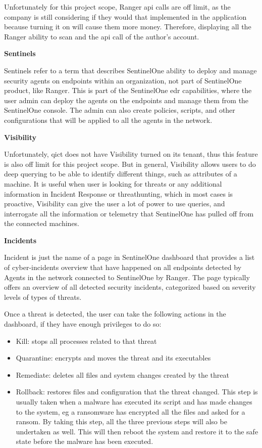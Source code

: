 Unfortunately for this project scope, Ranger \acrshort{api} calls are off limit, as the company is still considering if they would
that implemented in the application because turning it on will cause them more money. Therefore, displaying all the Ranger ability
to scan and the \acrshort{api} call of the author's account.

\textbf{Sentinels}

Sentinels refer to a term that describes SentinelOne ability to deploy and manage security agents on endpoints within an
organization, not part of SentinelOne product, like Ranger. This is part of the SentinelOne \acrshort{edr} capabilities,
where the user admin can deploy the agents on the endpoints and manage them from the SentinelOne console. The admin can
also create policies, scripts, and other configurations that will be applied to all the agents in the network.

\textbf{Visibility}

Unfortunately, \acrshort{qict} does not have Visibility turned on its tenant, thus this feature is also off limit for this project
scope. But in general, Visibility allows users to do deep querying to be able to identify different things, such as attributes of
a machine. It is useful when user is looking for threats or any additional information in Incident Response or \gls{threathunting},
which in most cases is proactive, Visibility can give the user a lot of power to use queries, and interrogate all the information
or telemetry that SentinelOne has pulled off from the connected machines.

\textbf{Incidents}

Incident is just the name of a page in SentinelOne dashboard that provides a list of cyber-incidents overview that have happened on all
endpoints detected by Agents in the network connected to SentinelOne by Ranger. The page typically offers an overview of all detected
security incidents, categorized based on severity levels of types of threats.

Once a threat is detected, the user can take the following actions in the dashboard, if they have enough privileges
to do so:
\begin{itemize}
      \item Kill: stops all processes related to that threat
      \item Quarantine: encrypts and moves the threat and its executables
      \item Remediate: deletes all files and system changes created by the threat
      \item Rollback: restores files and configuration that the threat changed. This step is usually taken when a malware has
            executed its script and has made changes to the system, \acrshort{eg} a ransomware has encrypted all the files and
            asked for a ransom. By taking this step, all the three previous steps will also be undertaken as well. This will
            then reboot the system and restore it to the safe state before the malware has been executed.
\end{itemize}


